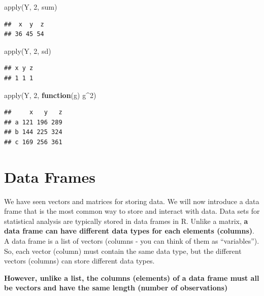 \documentclass[
]{book}
\newenvironment{Shaded}{\begin{snugshade}}{\end{snugshade}}
\newcommand{\ControlFlowTok}[1]{\textcolor[rgb]{0.13,0.29,0.53}{\textbf{#1}}}
\newcommand{\DecValTok}[1]{\textcolor[rgb]{0.00,0.00,0.81}{#1}}
\newcommand{\FunctionTok}[1]{\textcolor[rgb]{0.00,0.00,0.00}{#1}}
\newcommand{\NormalTok}[1]{#1}
\newcommand{\SpecialCharTok}[1]{\textcolor[rgb]{0.00,0.00,0.00}{#1}}
\begin{document}
\begin{Shaded}
\begin{Highlighting}[]
\FunctionTok{apply}\NormalTok{(Y, }\DecValTok{2}\NormalTok{, sum)}
\end{Highlighting}
\end{Shaded}

\begin{verbatim}
##  x  y  z 
## 36 45 54
\end{verbatim}

\begin{Shaded}
\begin{Highlighting}[]
\FunctionTok{apply}\NormalTok{(Y, }\DecValTok{2}\NormalTok{, sd)}
\end{Highlighting}
\end{Shaded}

\begin{verbatim}
## x y z 
## 1 1 1
\end{verbatim}

\begin{Shaded}
\begin{Highlighting}[]
\FunctionTok{apply}\NormalTok{(Y, }\DecValTok{2}\NormalTok{, }\ControlFlowTok{function}\NormalTok{(g) g}\SpecialCharTok{\^{}}\DecValTok{2}\NormalTok{)}
\end{Highlighting}
\end{Shaded}

\begin{verbatim}
##     x   y   z
## a 121 196 289
## b 144 225 324
## c 169 256 361
\end{verbatim}

\hypertarget{data-frames}{%
\section{Data Frames}\label{data-frames}}

We have seen vectors and matrices for storing data. We will now introduce a data frame that is the most common way to store and interact with data. Data sets for statistical analysis are typically stored in data frames in R. Unlike a matrix, \textbf{a data frame can have different data types for each elements (columns)}. A data frame is a list of vectors (columns - you can think of them as ``variables''). So, each vector (column) must contain the same data type, but the different vectors (columns) can store different data types.

\textbf{However, unlike a list, the columns (elements) of a data frame must all be vectors and have the same length (number of observations)}
\end{document}
